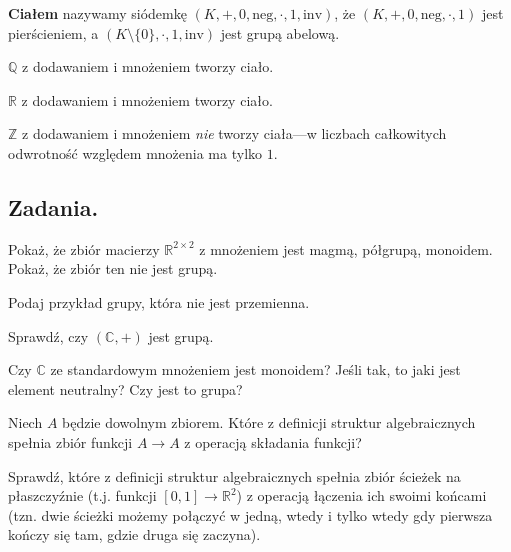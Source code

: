 \begin{definition}
	\textbf{Ciałem} nazywamy siódemkę $(K, +, 0, \mathrm{neg}, \cdot, 1, \mathrm{inv})$,
		że $(K, +, 0, \mathrm{neg}, \cdot, 1)$ jest pierścieniem,
		a $(K \setminus \{0\}, \cdot, 1, \mathrm{inv})$ jest grupą abelową.
\end{definition}

\begin{example}
	$\mathbb{Q}$ z dodawaniem i mnożeniem tworzy ciało.
\end{example}

\begin{example}
	$\mathbb{R}$ z dodawaniem i mnożeniem tworzy ciało.
\end{example}

\begin{example}
	$\mathbb{Z}$ z dodawaniem i mnożeniem \textit{nie} tworzy ciała---w liczbach całkowitych
		odwrotność względem mnożenia ma tylko $1$.
\end{example}

\subsection{Zadania.}

\begin{exercise}
	Pokaż, że zbiór macierzy $\mathbb{R}^{2 \times 2}$ z mnożeniem
		jest magmą, półgrupą, monoidem.
	Pokaż, że zbiór ten nie jest grupą.
\end{exercise}

\begin{exercise}
	Podaj przykład grupy, która nie jest przemienna.
\end{exercise}

\begin{exercise}
	Sprawdź, czy $(\mathbb{C}, +)$ jest grupą.
\end{exercise}

\begin{exercise}
	Czy $\mathbb{C}$ ze standardowym mnożeniem jest monoidem? Jeśli tak, to jaki jest element neutralny? Czy jest to grupa?
\end{exercise}

\begin{exercise}
	Niech $A$ będzie dowolnym zbiorem.
	Które z definicji struktur algebraicznych spełnia zbiór funkcji $A \to A$ z operacją składania funkcji?
\end{exercise}

\begin{exercise}
	Sprawdź,
		które z definicji struktur algebraicznych spełnia zbiór ścieżek na płaszczyźnie
		(t.j. funkcji $[0, 1] \to \mathbb{R}^2$) z operacją łączenia ich swoimi końcami
		(tzn. dwie ścieżki możemy połączyć w jedną,
			wtedy i tylko wtedy gdy pierwsza kończy się tam,
			gdzie druga się zaczyna).
\end{exercise}

